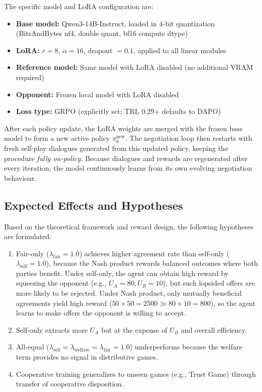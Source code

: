 \documentclass[12pt,a4paper]{article}
\begin{document}
The specific model and LoRA configuration are:

\begin{itemize}
    \item \textbf{Base model:} Qwen3-14B-Instruct, loaded in 4-bit quantization (BitsAndBytes nf4, double quant, bf16 compute dtype)
    \item \textbf{LoRA:} $r=8$, $\alpha=16$, dropout $= 0.1$, applied to all linear modules
    \item \textbf{Reference model:} Same model with LoRA disabled (no additional VRAM required)
    \item \textbf{Opponent:} Frozen local model with LoRA disabled
    \item \textbf{Loss type:} GRPO (explicitly set; TRL 0.29+ defaults to DAPO)
\end{itemize}

After each policy update, the LoRA weights are merged with the frozen base model to form a new active policy $\pi_{\theta}^{\text{new}}$. The negotiation loop then restarts with fresh self-play dialogues generated from this updated policy, keeping the procedure \textit{fully on-policy}. Because dialogues and rewards are regenerated after every iteration, the model continuously learns from its own evolving negotiation behaviour.


\subsection{Expected Effects and Hypotheses}\label{sec:hypotheses}

Based on the theoretical framework and reward design, the following hypotheses are formulated:

\begin{enumerate}[label=\textbf{H\arabic*:}]
    \item Fair-only ($\lambda_{\text{fair}}=1.0$) achieves higher agreement rate than self-only ($\lambda_{\text{self}}=1.0$), because the Nash product rewards balanced outcomes where both parties benefit. Under self-only, the agent can obtain high reward by squeezing the opponent (e.g., $U_A=80, U_B=10$), but such lopsided offers are more likely to be rejected. Under Nash product, only mutually beneficial agreements yield high reward ($50 \times 50 = 2500 \gg 80 \times 10 = 800$), so the agent learns to make offers the opponent is willing to accept.
    \item Self-only extracts more $U_A$ but at the expense of $U_B$ and overall efficiency.
    \item All-equal ($\lambda_{\text{self}} = \lambda_{\text{welfare}} = \lambda_{\text{fair}} = 1.0$) underperforms because the welfare term provides no signal in distributive games.
    \item Cooperative training generalizes to unseen games (e.g., Trust Game) through transfer of cooperative disposition.
\end{enumerate}
\end{document}
